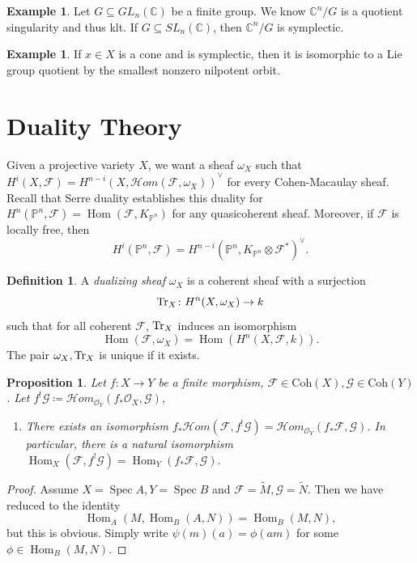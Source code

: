 \documentclass[leqno, openany]{memoir}
\newtheorem{prop}[thm]{Proposition}
\theoremstyle{definition}
\newtheorem{defn}[thm]{Definition}
\newtheorem{exm}[thm]{Example}
\theoremstyle{remark}
\theoremstyle{plain}
\theoremstyle{definition}
\theoremstyle{remark}
\newcommand{\C}{\mathbb{C}}
\renewcommand{\P}{\mathbb{P}}
\newcommand{\msc}[1]{\mathscr{#1}}
\newcommand{\mr}[1]{\mathrm{#1}}
\newcommand{\wt}[1]{\widetilde{#1}}
\DeclareMathOperator{\Hom}{Hom}
\DeclareMathOperator{\Spec}{Spec}
\begin{document}
\begin{exm}
    Let $G \subseteq GL_n(\C)$ be a finite group. We know $\C^n/G$ is a quotient singularity and thus klt. If $G \subseteq SL_n(\C)$, then $\C^n/G$ is symplectic.
\end{exm}

\begin{exm}
    If $x \in X$ is a cone and is symplectic, then it is isomorphic to a Lie group quotient by the smallest nonzero nilpotent orbit.
\end{exm}

\section{Duality Theory}%
\label{sec:duality_theory}

Given a projective variety $X$, we want a sheaf $\omega_X$ such that $H^i(X, \msc{F}) = { H^{n-i}(X, \msc{H}om(\msc{F}, \omega_X)) }^{\vee}$ for every Cohen-Macaulay sheaf. Recall that Serre duality establishes this duality for $H^n(\P^n, \msc{F}) = \Hom(\msc{F}, K_{\P^n})$ for any quasicoherent sheaf. Moreover, if $\msc{F}$ is locally free, then
\[ H^i(\P^n, \msc{F}) = { H^{n-i}(\P^n, K_{\P^n} \otimes \msc{F}^*) }^{\vee}. \]
\begin{defn}
    A \textit{dualizing sheaf} $\omega_X$ is a coherent sheaf with a surjection
    \[ \Tr_X \colon H^n(X, \omega_X) \to k \]
    such that for all coherent $\msc{F}$, $\Tr_X$ induces an isomorphism
    \[ \Hom (\msc{F}, \omega_X) = \Hom(H^n(X, \msc{F}, k)). \]
    The pair $\omega_X, \Tr_X$ is unique if it exists.
\end{defn}

\begin{prop}
    Let $f \colon X \to Y$ be a finite morphism, $\msc{F} \in \mr{Coh}(X), \msc{G} \in \mr{Coh}(Y)$. Let $f^! \msc{G} \coloneqq \msc{H}om_{\msc{O}_Y}(f_* \msc{O}_X, \msc{G})$,
    \begin{enumerate}
        \item There exists an isomorphism $f_* \msc{H}om(\msc{F}, f^! \msc{G}) = \msc{H}om_{\msc{O}_Y}(f_* \msc{F}, \msc{G})$.
        In particular, there is a natural isomorphism $\Hom_X(\msc{F}, f^! \msc{G}) = \Hom_Y(f_* \msc{F}, \msc{G})$.
    \end{enumerate}
\end{prop}

\begin{proof}
    Assume $X = \Spec A, Y = \Spec B$ and $\msc{F} = \wt{M}, \msc{G} = \wt{N}$. Then we have reduced to the identity
    \[ \Hom_A(M, \Hom_B(A, N)) = \Hom_B(M, N), \]
    but this is obvious. Simply write $\psi(m)(a) = \phi(am)$ for some $\phi \in \Hom_B(M, N)$.
\end{proof}
\end{document}
